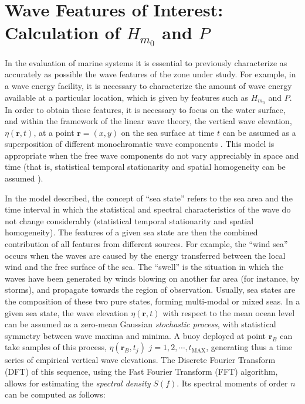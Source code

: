 \section{Wave Features of Interest: Calculation of $H_{m_0}$ and $P$}\label{sec:hybrid_system}
In the evaluation of marine systems it is essential to previously characterize as accurately as possible the wave features of the zone under study. For example, in a wave energy facility, it is necessary to characterize the amount of wave energy available at a particular location, which is given by features such as $H_{m_0}$ and $P$. In order to obtain these features, it is necessary to focus on the water surface, and within the framework of the linear wave theory, the vertical wave elevation, $\eta(\mathbf{r},t)$, at a point $\mathbf{r}=(x,y)$ on the sea surface at time $t$ can be assumed as a superposition of different monochromatic wave components \citep{borge2013detection,yoshimi2010random}. This model is appropriate when the free wave components do not vary appreciably in space and time (that is, statistical temporal stationarity and spatial homogeneity can be assumed \citep{yoshimi2010random}).

In the model described, the concept of ``sea state'' refers to the sea area and the time interval in which the statistical and spectral characteristics of the wave do not change considerably (statistical temporal stationarity and spatial homogeneity). The features of a given sea state are then the combined contribution of all features from different sources. For example, the ``wind sea'' occurs when the waves are caused by the energy transferred between the local wind and the free surface of the sea. The ``swell'' is the situation in which the waves have been generated by winds blowing on another far area (for instance, by storms), and propagate towards the region of observation. Usually, sea states are the composition of these two pure states, forming multi-modal or mixed seas.
In a given sea state, the wave elevation $\eta(\mathbf{r},t)$ with respect to the mean ocean level can be assumed as a zero-mean Gaussian \emph{stochastic process}, with statistical symmetry between wave maxima and minima. A buoy deployed at point $\mathbf{r}_B$ can take samples of this process, $\eta(\mathbf{r}_B,t_j)$ $j=1,2, \cdots , t_{\mathrm{MAX}}$, generating thus a time series of empirical vertical wave elevations. The Discrete Fourier Transform (DFT) of this sequence, using the Fast Fourier Transform (FFT) algorithm, allows for estimating the \emph{spectral density} $S(f)$. Its spectral moments of order $n$ can be computed as follows:

